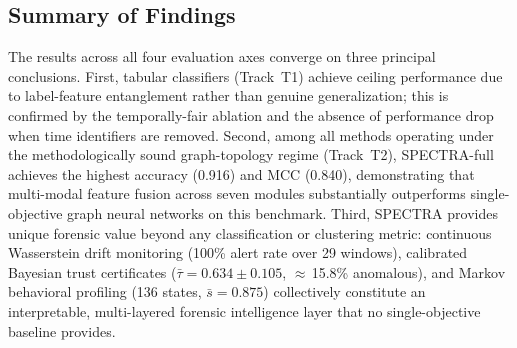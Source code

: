 \subsection{Summary of Findings}
\label{subsec:summary}

The results across all four evaluation axes converge on three principal
conclusions.
First, tabular classifiers (Track~T1) achieve ceiling performance due to
label-feature entanglement rather than genuine generalization; this is
confirmed by the temporally-fair ablation and the absence of performance
drop when time identifiers are removed.
Second, among all methods operating under the methodologically sound
graph-topology regime (Track~T2), SPECTRA-full achieves the highest accuracy
(\num{0.916}) and MCC (\num{0.840}), demonstrating that multi-modal feature
fusion across seven modules substantially outperforms single-objective
graph neural networks on this benchmark.
Third, SPECTRA provides unique forensic value beyond any classification or
clustering metric: continuous Wasserstein drift monitoring (100\% alert rate
over \num{29} windows), calibrated Bayesian trust certificates
($\bar{\tau} = \num{0.634} \pm \num{0.105}$, $\approx$\,15.8\% anomalous),
and Markov behavioral profiling (\num{136} states, $\bar{s} = \num{0.875}$)
collectively constitute an interpretable, multi-layered forensic intelligence
layer that no single-objective baseline provides.
